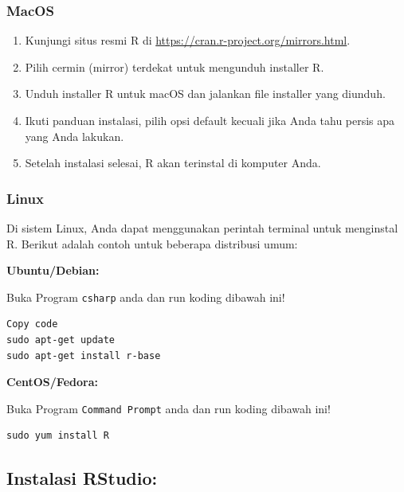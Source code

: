 \documentclass[
]{book}
\providecommand{\tightlist}{%
  \setlength{\itemsep}{0pt}\setlength{\parskip}{0pt}}
\begin{document}
\hypertarget{macos}{%
\subsubsection*{MacOS}\label{macos}}

\begin{enumerate}
\def\labelenumi{\arabic{enumi}.}
\tightlist
\item
  Kunjungi situs resmi R di \url{https://cran.r-project.org/mirrors.html}.
\item
  Pilih cermin (mirror) terdekat untuk mengunduh installer R.
\item
  Unduh installer R untuk macOS dan jalankan file installer yang diunduh.
\item
  Ikuti panduan instalasi, pilih opsi default kecuali jika Anda tahu persis apa yang Anda lakukan.
\item
  Setelah instalasi selesai, R akan terinstal di komputer Anda.
\end{enumerate}

\hypertarget{linux}{%
\subsubsection*{Linux}\label{linux}}

Di sistem Linux, Anda dapat menggunakan perintah terminal untuk menginstal R. Berikut adalah contoh untuk beberapa distribusi umum:

\textbf{Ubuntu/Debian:}

Buka Program \texttt{csharp} anda dan run koding dibawah ini!

\begin{verbatim}
Copy code
sudo apt-get update
sudo apt-get install r-base
\end{verbatim}

\textbf{CentOS/Fedora:}

Buka Program \texttt{Command\ Prompt} anda dan run koding dibawah ini!

\begin{verbatim}
sudo yum install R
\end{verbatim}

\hypertarget{instalasi-rstudio}{%
\subsection{Instalasi RStudio:}\label{instalasi-rstudio}}
\end{document}
